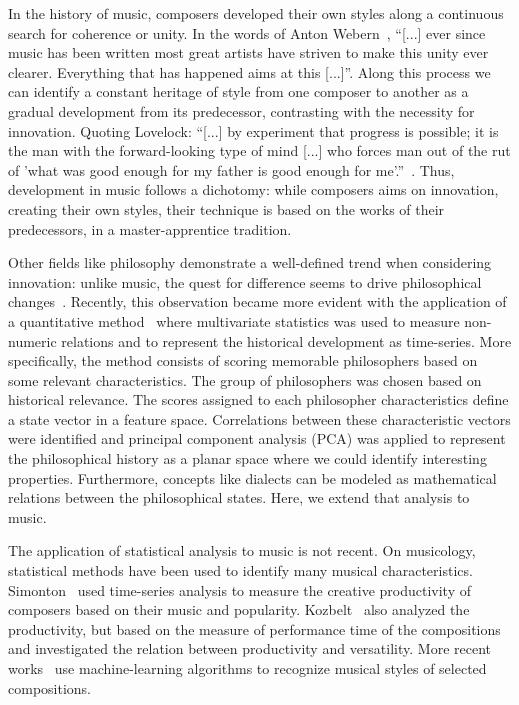 \documentclass[
 aip,
 jmp,
 amsmath,amssymb,
 reprint,
]{revtex4-1}
\begin{document}
In the history of music, composers developed their own styles along a
continuous search for coherence or unity. In the words of Anton
Webern~\cite{Webern}, ``[...] ever since music has been written most great artists
have striven to make this unity ever clearer. Everything that has
happened aims at this [...]''. Along this process we can identify
a constant heritage of style from one composer to another as
a gradual development from its
predecessor, contrasting with the necessity for innovation. Quoting
Lovelock: 
``[...] by experiment that progress is possible; it is the man
with the forward-looking type of mind [...] who forces man out of the
rut of 'what was good enough for my father is good enough for me'.''~\cite{Lovelock}.
Thus, development in music follows a dichotomy: while composers aims on
innovation, creating their own styles, their technique is based on the
works of their predecessors, in a master-apprentice tradition.

Other fields like philosophy demonstrate
a well-defined trend when considering innovation: unlike music, the
quest for difference seems to drive philosophical
changes~\cite{Deleuze}. Recently, this observation became more evident with
the application of a quantitative method~\cite{Fabbri} where
multivariate statistics was used to measure non-numeric relations and
to represent the historical development as time-series. More specifically, the method consists of
scoring memorable philosophers based on some relevant
characteristics. The group of philosophers was chosen
based on historical relevance. The
scores assigned to each philosopher characteristics define a state
vector in a feature space. Correlations between these
characteristic vectors were identified and principal component
analysis (PCA) was applied to
represent the philosophical history as a planar space where we could
identify interesting properties. Furthermore, concepts
like dialects can be modeled as mathematical relations between the
philosophical states. Here, we extend that analysis to music.

The application of statistical analysis to
music is not recent. On musicology, statistical methods have been used
to identify many musical characteristics.
Simonton~\cite{Simonton1991829, Simonton1977791} used time-series analysis to measure the creative productivity
of composers based on their music and popularity. Kozbelt~\cite{Kozbelt01012009, Kozbelt01012007} also
analyzed the productivity, but based on the measure of performance
time of the compositions and investigated the relation between
productivity and versatility. More recent works~\cite{Kranenburg2004, Kranenburg2007} use machine-learning
algorithms to recognize musical styles of selected compositions.
\end{document}
